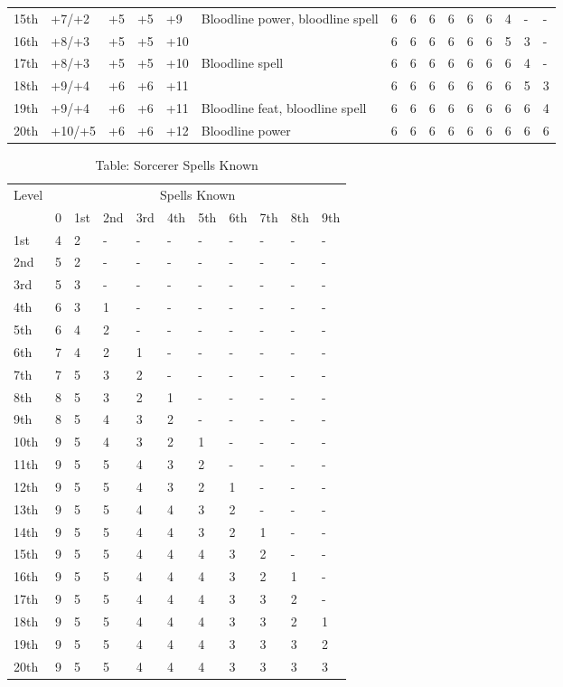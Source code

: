 \begin{table}[]
\begin{tabularx}{\linewidth}{lp{6em}p{2.5em}p{2.5em}p{2.5em}Xlllllllll}
15th & +7/+2 & +5 & +5 & +9 & Bloodline power, bloodline spell & 6 & 6 & 6 & 6 & 6 & 6 & 4 & - & -\\
16th & +8/+3 & +5 & +5 & +10 &  & 6 & 6 & 6 & 6 & 6 & 6 & 5 & 3 & -\\
17th & +8/+3 & +5 & +5 & +10 & Bloodline spell & 6 & 6 & 6 & 6 & 6 & 6 & 6 & 4 & -\\
18th & +9/+4 & +6 & +6 & +11 &  & 6 & 6 & 6 & 6 & 6 & 6 & 6 & 5 & 3\\
19th & +9/+4 & +6 & +6 & +11 & Bloodline feat, bloodline spell & 6 & 6 & 6 & 6 & 6 & 6 & 6 & 6 & 4\\
20th & +10/+5 & +6 & +6 & +12 & Bloodline power & 6 & 6 & 6 & 6 & 6 & 6 & 6 & 6 & 6\\
\end{tabularx}
\end{table}

\begin{table}[]
\caption{Table: Sorcerer Spells Known}
\sffamily
\setlength{\tabcolsep}{1pt}
\begin{tabular}{lllllllllll}
Level & \multicolumn{10}{c}{Spells Known}\\
      & 0 & 1st & 2nd & 3rd & 4th & 5th & 6th & 7th & 8th & 9th\\
1st & 4 & 2 & - & - & - & - & - & - & - & -\\
2nd & 5 & 2 & - & - & - & - & - & - & - & -\\
3rd & 5 & 3 & - & - & - & - & - & - & - & -\\
4th & 6 & 3 & 1 & - & - & - & - & - & - & -\\
5th & 6 & 4 & 2 & - & - & - & - & - & - & -\\
6th & 7 & 4 & 2 & 1 & - & - & - & - & - & -\\
7th & 7 & 5 & 3 & 2 & - & - & - & - & - & -\\
8th & 8 & 5 & 3 & 2 & 1 & - & - & - & - & -\\
9th & 8 & 5 & 4 & 3 & 2 & - & - & - & - & -\\
10th & 9 & 5 & 4 & 3 & 2 & 1 & - & - & - & -\\
11th & 9 & 5 & 5 & 4 & 3 & 2 & - & - & - & -\\
12th & 9 & 5 & 5 & 4 & 3 & 2 & 1 & - & - & -\\
13th & 9 & 5 & 5 & 4 & 4 & 3 & 2 & - & - & -\\
14th & 9 & 5 & 5 & 4 & 4 & 3 & 2 & 1 & - & -\\
15th & 9 & 5 & 5 & 4 & 4 & 4 & 3 & 2 & - & -\\
16th & 9 & 5 & 5 & 4 & 4 & 4 & 3 & 2 & 1 & -\\
17th & 9 & 5 & 5 & 4 & 4 & 4 & 3 & 3 & 2 & -\\
18th & 9 & 5 & 5 & 4 & 4 & 4 & 3 & 3 & 2 & 1\\
19th & 9 & 5 & 5 & 4 & 4 & 4 & 3 & 3 & 3 & 2\\
20th & 9 & 5 & 5 & 4 & 4 & 4 & 3 & 3 & 3 & 3\\
\end{tabular}
\end{table}

